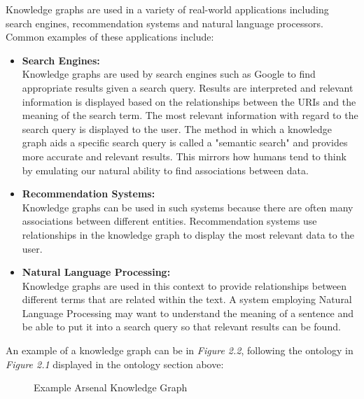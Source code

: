 Knowledge graphs are used in a variety of real-world applications including search engines, recommendation systems and natural language processors. Common examples of these applications include:

\begin{itemize}
    \itemsep0em 
\item \textbf{Search Engines:} \\Knowledge graphs are used by search engines such as Google to find appropriate results given a search query. Results are interpreted and relevant information is displayed based on the relationships between the URIs and the meaning of the search term. The most relevant information with regard to the search query is displayed to the user. The method in which a knowledge graph aids a specific search query is called a "semantic search" and provides more accurate and relevant results. This mirrors how humans tend to think by emulating our natural ability to find associations between data.  \cite{searchengine}  

\item \textbf{Recommendation Systems:} \\Knowledge graphs can be used in such systems because there are often many associations between different entities. Recommendation systems use relationships in the knowledge graph to display the most relevant data to the user. 

\item \textbf{Natural Language Processing:}\\ Knowledge graphs are used in this context to provide relationships between different terms that are related within the text. A system employing Natural Language Processing may want to understand the meaning of a sentence and be able to put it into a search query so that relevant results can be found. 

\end{itemize}

An example of a knowledge graph can be in \textit{Figure 2.2}, following the ontology in \textit{Figure 2.1} displayed in the ontology section above:

\begin{figure}[H]
\begin{center}
\end{center}
\caption{Example Arsenal Knowledge Graph}
\end{figure}

